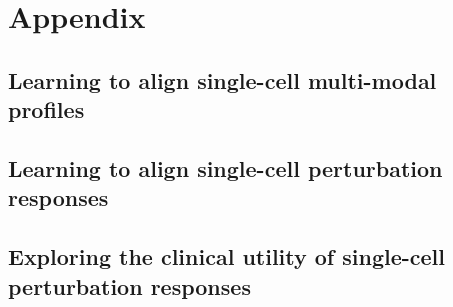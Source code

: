 \chapter{Appendix}

\section{Learning to align single-cell multi-modal profiles}

\cleardoublepageempty{}

\section{Learning to align single-cell perturbation responses}

\cleardoublepageempty{}

\section{Exploring the clinical utility of single-cell perturbation responses}

\cleardoublepageempty{}